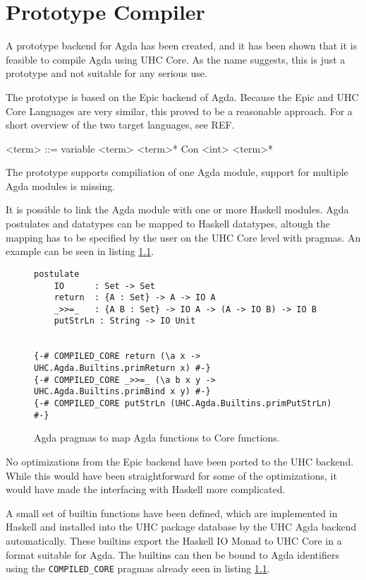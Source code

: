 \documentclass[12pt, a4paper, twoside]{report}
\begin{document}
\chapter{Prototype Compiler}
A prototype backend for Agda has been created, and it has been shown that it is feasible to compile
Agda using UHC Core. As the name suggests, this is just a prototype and not suitable for any serious use.

The prototype is based on the Epic backend of Agda. Because the Epic and UHC Core Languages are
very similar, this proved to be a reasonable approach. For a short overview of the two target
languages, see REF.

\begin{grammar}
<term> ::= variable
\alt <term> <term>*
\alt Con <int> <term>*
\end{grammar}

The prototype supports compiliation of one Agda module, support for multiple Agda modules is missing.

It is possible to link the Agda module with one or more Haskell modules. Agda postulates
and datatypes can be mapped to Haskell datatypes, altough the mapping has to be specified
by the user on the UHC Core level with pragmas. An example can be seen in listing \ref{lst:agda-hs-pragmas}.
\begin{figure}
\begin{lstlisting}
postulate
    IO      : Set -> Set
    return  : {A : Set} -> A -> IO A
    _>>=_   : {A B : Set} -> IO A -> (A -> IO B) -> IO B
    putStrLn : String -> IO Unit


{-# COMPILED_CORE return (\a x -> UHC.Agda.Builtins.primReturn x) #-}
{-# COMPILED_CORE _>>=_ (\a b x y -> UHC.Agda.Builtins.primBind x y) #-}
{-# COMPILED_CORE putStrLn (UHC.Agda.Builtins.primPutStrLn) #-}
\end{lstlisting}
\caption{Agda pragmas to map Agda functions to Core functions.}
\label{lst:agda-hs-pragmas}
\end{figure}

No optimizations from the Epic backend have been ported to the UHC backend. While this
would have been straightforward for some of the optimizations, it would have made the
interfacing with Haskell more complicated.

A small set of builtin functions have been defined, which are implemented in Haskell
and installed into the UHC package database by the UHC Agda backend automatically. These
builtins export the Haskell IO Monad to UHC Core in a format suitable for Agda.
The builtins can then be bound to Agda identifiers using the \texttt{COMPILED_CORE} pragmas
already seen in listing \ref{lst:agda-hs-pragmas}.
\end{document}
